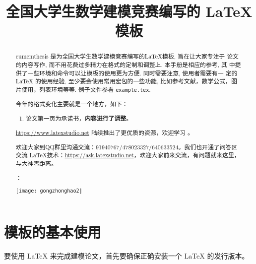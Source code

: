 \documentclass[withoutpreface,bwprint]{cumcmthesis} %
\title{全国大学生数学建模竞赛编写的 \LaTeX{} 模板}
\begin{document}
 \maketitle
 \begin{abstract}
cumcmthesis 是为全国大学生数学建模竞赛编写的\LaTeX{}模板, 旨在让大家专注于 论文的内容写作, 而不用花费过多精力在格式的定制和调整上. 本手册是相应的参考, 其 中提供了一些环境和命令可以让模板的使用更为方便. 同时需要注意, 使用者需要有一 定的 \LaTeX{} 的使用经验, 至少要会使用常用宏包的一些功能, 比如参考文献，数学公式，图片使用，列表环境等等. 例子文件参看 \texttt{example.tex}.

\begin{mdframed} [%
	roundcorner=5pt,
	linecolor=gray!50,
	outerlinewidth=0.5pt,
	middlelinewidth=0.3pt, backgroundcolor=gray!2,
innertopmargin=\topskip, frametitle={2023 年建模比赛格式变化说明},
frametitlefont= \bfseries,frametitlerule=true,frametitlealignment =\raggedright\noindent,
frametitlerulewidth=.5pt, frametitlebackgroundcolor=gray!2,]
今年的格式变化主要就是一个地方，如下：
\begin{enumerate}
\item 论文第一页为承诺书，\textbf{\color{red}内容进行了调整}。

 

\end{enumerate}

\end{mdframed}


\url{https://www.latexstudio.net} 陆续推出了更优质的资源，欢迎学习 。

欢迎大家到QQ群里沟通交流：91940767/478023327/640633524。我们也开通了问答区交流 \LaTeX{}技术：\url{https://ask.latexstudio.net}，欢迎大家前来交流，有问题就来这里，与大神零距离。

：

\centerline{\texttt{[image: gongzhonghao2]}}

\end{abstract}



\section{模板的基本使用}

要使用 \LaTeX{} 来完成建模论文，首先要确保正确安装一个 \LaTeX{} 的发行版本。
\end{document}
